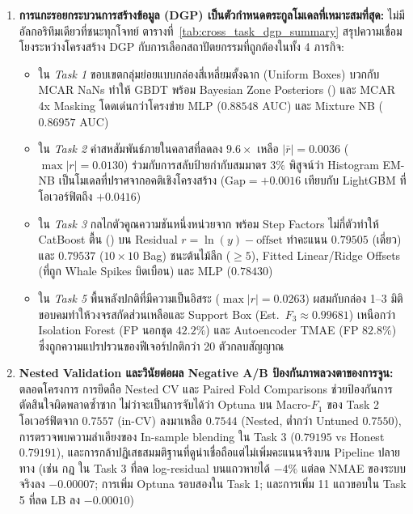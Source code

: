 \begin{enumerate}
  \item \textbf{การแกะรอยกระบวนการสร้างข้อมูล (DGP) เป็นตัวกำหนดตระกูลโมเดลที่เหมาะสมที่สุด:}
  ไม่มีอัลกอริทึมเดียวที่ชนะทุกโจทย์ ตารางที่~\ref{tab:cross_task_dgp_summary} สรุปความเชื่อมโยงระหว่างโครงสร้าง DGP กับการเลือกสถาปัตยกรรมที่ถูกต้องในทั้ง 4 ภารกิจ:
  \begin{itemize}
    \item ใน \emph{Task 1} ขอบเขตกลุ่มย่อยแบบกล่องสี่เหลี่ยมตั้งฉาก (Uniform Boxes) บวกกับ MCAR NaNs ทำให้ GBDT พร้อม Bayesian Zone Posteriors () และ MCAR 4x Masking โดดเด่นกว่าโครงข่าย MLP ($0.88548$ AUC) และ Mixture NB ($0.86957$ AUC)
    \item ใน \emph{Task 2} ค่าสหสัมพันธ์ภายในคลาสที่ลดลง $9.6\times$ เหลือ $|\bar{r}| = 0.0036$ ($\max |r| = 0.0130$) ร่วมกับการสลับป้ายกำกับสมมาตร $3\%$ พิสูจน์ว่า Histogram EM-NB เป็นโมเดลที่ปราศจากอคติเชิงโครงสร้าง ($\text{Gap} = +0.0016$ เทียบกับ LightGBM ที่โอเวอร์ฟิตถึง $+0.0416$)
    \item ใน \emph{Task 3} กลไกตัวคูณความชันหนึ่งหน่วยจาก  พร้อม Step Factors ไม่กี่ตัวทำให้ CatBoost  ตื้น () บน Residual $r = \ln(y) - \text{offset}$ ทำคะแนน $0.79505$ (เดี่ยว) และ $0.79537$ ($10\times 10$ Bag) ชนะต้นไม้ลึก ($\ge 5$), Fitted Linear/Ridge Offsets (ที่ถูก Whale Spikes บิดเบือน) และ MLP ($0.78430$)
    \item ใน \emph{Task 5} พื้นหลังปกติที่มีความเป็นอิสระ ($\max |r| = 0.0263$) ผสมกับกล่อง 1--3 มิติขอบคมทำให้วงจรสกัดส่วนเหลือและ Support Box (Est.\ $F_3 \approx 0.99681$) เหนือกว่า Isolation Forest (FP นอกชุด $42.2\%$) และ Autoencoder TMAE (FP $82.8\%$) ซึ่งถูกความแปรปรวนของฟีเจอร์ปกติกว่า 20 ตัวกลบสัญญาณ
  \end{itemize}

  \item \textbf{Nested Validation และวินัยต่อผล Negative A/B ป้องกันภาพลวงตาของการจูน:}
  ตลอดโครงการ การยึดถือ Nested CV และ Paired Fold Comparisons ช่วยป้องกันการตัดสินใจผิดพลาดซ้ำซาก ไม่ว่าจะเป็นการจับได้ว่า Optuna บน Macro-$F_1$ ของ Task 2 โอเวอร์ฟิตจาก $0.7557$ (in-CV) ลงมาเหลือ $0.7544$ (Nested, ต่ำกว่า Untuned $0.7550$), การตรวจพบความลำเอียงของ In-sample blending ใน Task 3 ($0.79195$ vs Honest $0.79191$), และการกล้าปฏิเสธสมมติฐานที่ดูน่าเชื่อถือแต่ไม่เพิ่มคะแนนจริงบน Pipeline ปลายทาง (เช่น กฎ  ใน Task 3 ที่ลด log-residual บนแถวหายได้ $-4\%$ แต่ลด NMAE ของระบบจริงลง $-0.00007$; การเพิ่ม Optuna รอบสองใน Task 1; และการเพิ่ม 11 แถวขอบใน Task 5 ที่ลด LB ลง $-0.00010$)


\end{enumerate}
